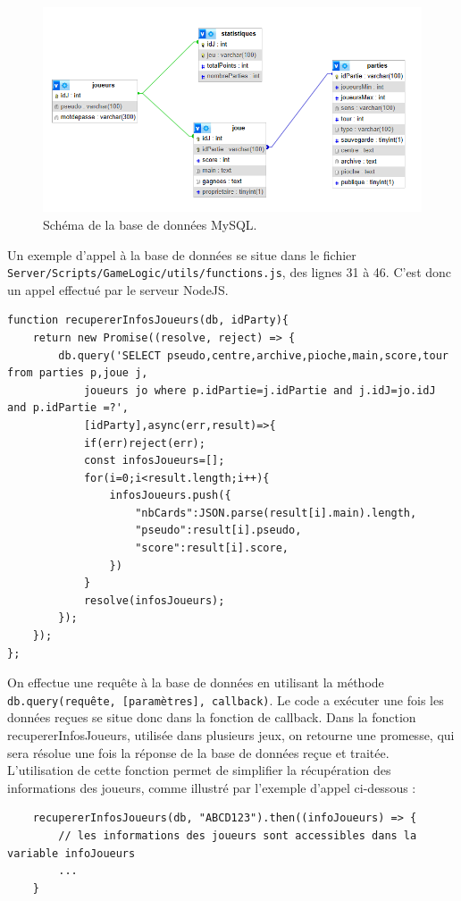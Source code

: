 \documentclass[a4paper]{article}
\begin{document}
\graphicspath{ {./} } %
\begin{figure}[ht]
\centering
\includegraphics[width=1\textwidth]{bdd.png}
\caption{Schéma de la base de données MySQL.}
\label{fig:bdd}
\end{figure}

Un exemple d'appel à la base de données se situe dans le fichier \texttt{Server/Scripts/GameLogic/utils/functions.js}, des lignes 31 à 46. C'est donc un appel effectué par le serveur NodeJS.\\
\begin{verbatim}
function recupererInfosJoueurs(db, idParty){
    return new Promise((resolve, reject) => {
        db.query('SELECT pseudo,centre,archive,pioche,main,score,tour from parties p,joue j,
            joueurs jo where p.idPartie=j.idPartie and j.idJ=jo.idJ and p.idPartie =?',
            [idParty],async(err,result)=>{
            if(err)reject(err);
            const infosJoueurs=[];
            for(i=0;i<result.length;i++){
                infosJoueurs.push({
                    "nbCards":JSON.parse(result[i].main).length,
                    "pseudo":result[i].pseudo,
                    "score":result[i].score,
                })
            }
            resolve(infosJoueurs);
        });
    });
};
\end{verbatim}
On effectue une requête à la base de données en utilisant la méthode \texttt{db.query(requête, [paramètres], callback)}. Le code a exécuter une fois les données reçues se situe donc dans la fonction de callback.
Dans la fonction recupererInfosJoueurs, utilisée dans plusieurs jeux, on retourne une promesse, qui sera résolue une fois la réponse de la base de données reçue et traitée.
L'utilisation de cette fonction permet de simplifier la récupération des informations des joueurs, comme illustré par l'exemple d'appel ci-dessous :
\begin{verbatim}
    recupererInfosJoueurs(db, "ABCD123").then((infoJoueurs) => {
        // les informations des joueurs sont accessibles dans la variable infoJoueurs
        ...
    }
\end{verbatim}
\end{document}
